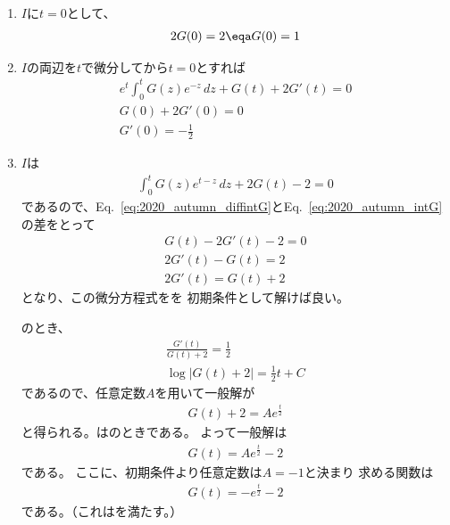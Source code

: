 \begin{ans*}
  ${}$
  \begin{enumerate}[label=(\alph*)]
    \item $I$に$t=0$として、
    \begin{align}
      2G(0) = 2 \eqa G(0) = 1
    \end{align}
    \item $I$の両辺を$t$で微分してから$t=0$とすれば
    \begin{gather}
      e^t\int_{0}^{t}G(z)e^{-z}\,dz + G(t) + 2G'(t) = 0 \label{eq:2020_autumn_diffintG}\\
      G(0) + 2G'(0) = 0 \\
      G'(0) = -\frac{1}{2}
    \end{gather}
    \item $I$は
    \begin{gather}
      \int_{0}^{t} G(z)e^{t-z}\,dz + 2G(t) - 2 = 0 \label{eq:2020_autumn_intG}
    \end{gather}
    であるので、Eq.~\eqref{eq:2020_autumn_diffintG}とEq.~\eqref{eq:2020_autumn_intG}の差をとって
    \begin{gather}
      G(t) - 2G'(t) - 2 = 0 \\
      2G'(t) - G(t) = 2 \\
      2G'(t) = G(t) + 2 \label{eq:2020_autumn_GODE}
    \end{gather}
    となり、この微分方程式をを
    初期条件として解けば良い。

    のとき、
    \begin{gather}
      \frac{G'(t)}{G(t)+2} = \frac{1}{2} \\
      \log |G(t)+2| = \frac{1}{2}t + C
    \end{gather}
    であるので、任意定数$A$を用いて一般解が
    \begin{gather}
      G(t) + 2 = Ae^\frac{t}{2}
    \end{gather}
    と得られる。はのときである。
    よって一般解は
    \begin{gather}
      G(t) = Ae^\frac{t}{2} - 2
    \end{gather}
    である。
    ここに、初期条件より任意定数は$A=-1$と決まり
    求める関数は
    \begin{gather}
      G(t) = -e^{\frac{t}{2}} - 2
    \end{gather}
    である。（これはを満たす。）
  \end{enumerate}
\end{ans*}

